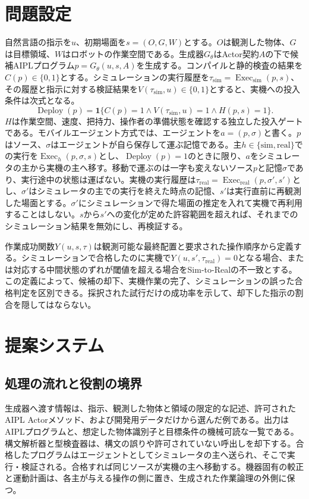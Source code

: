 \documentclass[10pt,letterpaper]{article}
\begin{document}
\section{問題設定}
自然言語の指示を$u$、初期場面を$s=(O,G,W)$とする。$O$は観測した物体、$G$は目標領域、$W$はロボットの作業空間である。生成器$G_{\theta}$はActor契約$A$の下で候補AIPLプログラム$p=G_{\theta}(u,s,A)$を生成する。コンパイルと静的検査の結果を$C(p)\in\{0,1\}$とする。シミュレーションの実行履歴を$\tau_{\mathrm{sim}}=\operatorname{Exec}_{\mathrm{sim}}(p,s)$、その履歴と指示に対する検証結果を$V(\tau_{\mathrm{sim}},u)\in\{0,1\}$とすると、実機への投入条件は次式となる。
\begin{equation}
\operatorname{Deploy}(p)=\mathbf{1}\{C(p)=1\land V(\tau_{\mathrm{sim}},u)=1\land H(p,s)=1\}.
\label{eq:gate}
\end{equation}
$H$は作業空間、速度、把持力、操作者の準備状態を確認する独立した投入ゲートである。モバイルエージェント方式では、エージェントを$a=(p,\sigma)$と書く。$p$はソース、$\sigma$はエージェントが自ら保存して運ぶ記憶である。主$h\in\{\mathrm{sim},\mathrm{real}\}$での実行を$\operatorname{Exec}_h(p,\sigma,s)$とし、$\operatorname{Deploy}(p)=1$のときに限り、$a$をシミュレータの主から実機の主へ移す。移動で運ぶのは一字も変えないソース$p$と記憶$\sigma$であり、実行途中の状態は運ばない。実機の実行履歴は$\tau_{\mathrm{real}}=\operatorname{Exec}_{\mathrm{real}}(p,\sigma',s')$とし、$\sigma'$はシミュレータの主での実行を終えた時点の記憶、$s'$は実行直前に再観測した場面とする。$\sigma'$にシミュレーションで得た場面の推定を入れて実機で再利用することはしない。$s$から$s'$への変化が定めた許容範囲を超えれば、それまでのシミュレーション結果を無効にし、再検証する。

作業成功関数$Y(u,s,\tau)$は観測可能な最終配置と要求された操作順序から定義する。シミュレーションで合格したのに実機で$Y(u,s',\tau_{\mathrm{real}})=0$となる場合、または対応する中間状態のずれが閾値を超える場合をSim-to-Realの不一致とする。この定義によって、候補の却下、実機作業の完了、シミュレーションの誤った合格判定を区別できる。採択された試行だけの成功率を示して、却下した指示の割合を隠してはならない。

\section{提案システム}\label{sec:system}
\subsection{処理の流れと役割の境界}
生成器へ渡す情報は、指示、観測した物体と領域の限定的な記述、許可されたAIPL Actorメソッド、および開発用データだけから選んだ例である。出力はAIPLプログラムと、想定した物体識別子と目標条件の機械可読な一覧である。構文解析器と型検査器は、構文の誤りや許可されていない呼出しを却下する。合格したプログラムはエージェントとしてシミュレータの主へ送られ、そこで実行・検証される。合格すれば同じソースが実機の主へ移動する。機器固有の較正と運動計画は、各主が与える操作の側に置き、生成された作業論理の外側に保つ。
\end{document}
